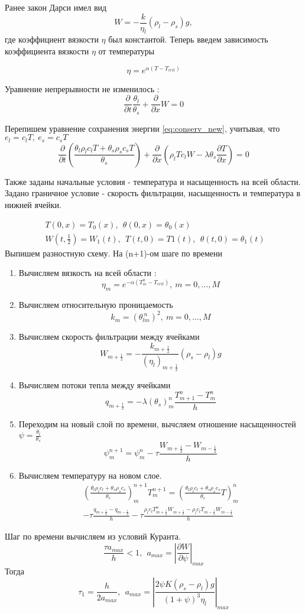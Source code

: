 \documentclass[12pt]{article}
\newcommand{\pd}[2]{\frac{\partial #1}{\partial #2}}
\begin{document}
Ранее закон Дарси имел вид 
$$
W= -\frac{k}{\eta_l}(\rho_l-\rho_s)g,
$$
где коэффициент вязкости $\eta $ был константой. Теперь введем зависимость коэффициента вязкости 	$ \eta $ от температуры

\begin{equation}
\eta = e^{\alpha(T - T_{crit})}
\label{viscos}
\end{equation}

Уравнение непрерывности не изменилось :
$$
\pd{}{t}\frac{\theta_l}{\theta_s} + \pd{}{x}W = 0
$$

Перепишем уравнение сохранения энергии \eqref{eq:conserv_new}, учитывая, что $ e_l = c_lT,\ e_s = c_sT $ 
\begin{equation}
\pd{}{t} \left(\frac{\theta_l \rho_l c_l T + \theta_s \rho_s c_s T}{\theta_s}\right) + \pd{}{x}\left(\rho_l T c_l W - \lambda \theta_s \pd{T}{x}\right) = 0
\label{conserv}
\end{equation}

Также заданы начальные условия -  температура и насыщенность на всей области. Задано граничное условие - скорость фильтрации, насыщенность и температура в нижней ячейки.

$$
\begin{aligned}
&T(0,x) = T_0(x), \ \ \theta(0, x) = \theta_0(x) \ \ \\
&W\left(t, \frac12\right)  = W_1(t),\ \ T(t, 0) = T1(t), \ \ \theta(t, 0) = \theta_1(t) \ \ 
\end{aligned}
$$ 
\newpage
Выпишем разностную схему. На (n+1)-ом шаге по времени 
\begin{enumerate}
\item Вычисляем вязкость на всей области : 
$$
\eta_m = e^{-\alpha(T_m^n - T_{crit})},\ m = 0, \dots ,M
$$
\item Вычисляем относительную проницаемость
$$
k_m = (\theta_{lm}^{\ n})^2 , \ m = 0,  \dots ,M
$$
\item Вычисляем скорость фильтрации между ячейками 
$$
W_{m+\frac12} = -\frac{k_{m+\frac12}}{(\eta_{l})_{m+\frac12}}(\rho_s - \rho_l)g
$$
\item Вычисляем потоки тепла между ячейками
$$
q_{m+\frac12} = - \lambda (\theta_{s})_m^{n} \frac{T_{m+1}^n - T_m^n}{h} 
$$
\item Переходим на новый слой по времени, вычсляем отношение насыщенностей $\psi = \frac {\theta_l}{\theta_s}$
$$
\psi_m^{n+1} = \psi_m^n - \tau \frac{W_{m+\frac12} - W_{m-\frac12}}{h}
$$
\item Вычисляем температуру на новом слое. 
\begin{multline}
\left(\frac{\theta_l \rho_l c_l + \theta_s \rho_s c_s}{\theta_s}\right)_m^{n+1} T_m^{n+1} =  \left(\frac{\theta_l \rho_l c_l + \theta_s \rho_s c_s}{\theta_s} T\right)_m^n \\
- \tau\frac{q_{m+\frac12} - q_{m-\frac12}}{h} - \tau\frac{\rho_l c_l T_{m+\frac12}^n W_{m+\frac12} - \rho_l c_l T_{m-\frac12} W_{m-\frac12}}{h}
\end{multline}
\end{enumerate}

Шаг по времени вычисляем из условий Куранта. 
$$
\frac{\tau a_{max}}{h} < 1,\ \ a_{max} = \left|\pd{W}{\psi}\right|_{max}
$$
Тогда
$$
\tau_1 = \frac{h}{2 a_{max}},\ \  a_{max} = \left|\frac{2 \psi K(\rho_s - \rho_l)g}{(1+\psi)^3 \eta_l}\right|_{max}
$$
\end{document}
